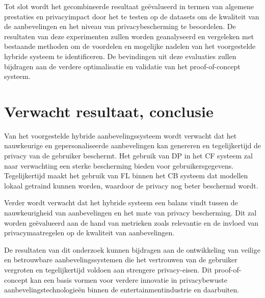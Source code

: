 Tot slot wordt het gecombineerde resultaat geëvalueerd in termen van algemene prestaties en privacyimpact door het te testen op de datasets om de kwaliteit van de aanbevelingen en het niveau van privacybescherming te beoordelen. De resultaten van deze experimenten zullen worden geanalyseerd en vergeleken met bestaande methoden om de voordelen en mogelijke nadelen van het voorgestelde hybride systeem te identificeren. De bevindingen uit deze evaluaties zullen bijdragen aan de verdere optimalisatie en validatie van het proof-of-concept systeem.

\section{Verwacht resultaat, conclusie}%
\label{sec:verwachte_resultaten}

Van het voorgestelde hybride aanbevelingssysteem wordt verwacht dat het nauwkeurige en gepersonaliseerde aanbevelingen kan genereren en tegelijkertijd de privacy van de gebruiker beschermt. Het gebruik van DP in het CF systeem zal naar verwachting een sterke bescherming bieden voor gebruikersgegevens. Tegelijkertijd maakt het gebruik van FL binnen het CB systeem dat modellen lokaal getraind kunnen worden, waardoor de privacy nog beter beschermd wordt.

Verder wordt verwacht dat het hybride systeem een balans vindt tussen de nauwkeurigheid van aanbevelingen en het mate van privacy bescherming. Dit zal worden geëvalueerd aan de hand van metrieken zoals relevantie en de invloed van privacymaatregelen op de kwaliteit van aanbevelingen.

De resultaten van dit onderzoek kunnen bijdragen aan de ontwikkeling van veilige en betrouwbare aanbevelingssystemen die het vertrouwen van de gebruiker vergroten en tegelijkertijd voldoen aan strengere privacy-eisen. Dit proof-of-concept kan een basis vormen voor verdere innovatie in privacybewuste aanbevelingstechnologieën binnen de entertainmentindustrie en daarbuiten.
